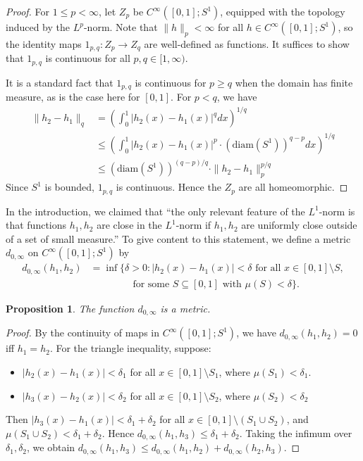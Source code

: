\documentclass[11pt, reqno, english]{amsart}
\theoremstyle{plain}
\newtheorem{proposition}[theorem]{Proposition}
\theoremstyle{definition}
\begin{document}
\begin{proof}
  For $1 \le p < \infty$, let $Z_{p}$ be $C^{\infty}([0, 1]; S^{1})$, equipped
  with the topology induced by the $L^{p}$-norm. Note that $\|h\|_{p} < \infty$
  for all $h \in C^{\infty}([0, 1]; S^{1})$, so the identity maps $1_{p,
  q}\colon Z_{p} \rightarrow Z_{q}$ are well-defined as functions. It suffices
  to show that $1_{p, q}$ is continuous for all $p, q \in [1, \infty)$.

  It is a standard fact that $1_{p, q}$ is continuous for $p \ge q$ when the
  domain has finite measure, as is the case here for $[0, 1]$. For $p < q$, we
  have
  \begin{align*}
    \|h_{2} - h_{1}\|_{q} &= \left(\int_{0}^{1}|h_{2}(x) -
    h_{1}(x)|^{q}dx\right)^{1/q}\\
    &\le \left(\int_{0}^{1}|h_{2}(x) - h_{1}(x)|^{p} \cdot
    (\text{diam}(S^{1}))^{q-p}dx\right)^{1/q}\\
    &\le (\text{diam}(S^{1}))^{(q-p)/q} \cdot \|h_{2} - h_{1}\|_{p}^{p/q}
  \end{align*}
  Since $S^{1}$ is bounded, $1_{p, q}$ is continuous. Hence the $Z_{p}$ are all
  homeomorphic.
\end{proof}

In the introduction, we claimed that ``the only relevant feature of the
$L^{1}$-norm is that functions $h_{1}, h_{2}$ are close in the $L^{1}$-norm if
$h_{1}, h_{2}$ are uniformly close outside of a set of small measure.'' To give
content to this statement, we define a metric $d_{0, \infty}$ on
$C^{\infty}([0, 1]; S^{1})$ by
\begin{align*}
  d_{0, \infty}(h_{1}, h_{2}) &= \inf\{\delta > 0 : |h_{2}(x) - h_{1}(x)| <
  \delta \text{ for all } x \in [0, 1] \setminus S,\\
  &\qquad\qquad \text{ for some } S \subseteq [0, 1] \text{ with } \mu(S) <
  \delta\}.
\end{align*}

\begin{proposition}
  The function $d_{0, \infty}$ is a metric.
\end{proposition}

\begin{proof}
  By the continuity of maps in $C^{\infty}([0, 1]; S^{1})$, we have $d_{0,
  \infty}(h_{1}, h_{2}) = 0$ iff $h_{1} = h_{2}$. For the triangle inequality,
  suppose:
  \begin{itemize}
    \item $|h_{2}(x) - h_{1}(x)| < \delta_{1}$ for all $x \in [0, 1]\setminus
  S_{1}$, where $\mu(S_{1}) < \delta_{1}$.
    \item $|h_{3}(x) - h_{2}(x)| < \delta_{2}$ for all $x \in [0, 1]\setminus
    S_{2}$, where $\mu(S_{2}) < \delta_{2}$
  \end{itemize}
  Then $|h_{3}(x) - h_{1}(x)| < \delta_{1} + \delta_{2}$ for all $x \in [0,
  1]\setminus (S_{1} \cup S_{2})$, and $\mu(S_{1}\cup S_{2}) < \delta_{1} +
  \delta_{2}$. Hence $d_{0, \infty}(h_{1}, h_{3}) \le \delta_{1} + \delta_{2}$.
  Taking the infimum over $\delta_{1}, \delta_{2}$, we obtain $d_{0,
  \infty}(h_{1}, h_{3}) \le d_{0, \infty}(h_{1}, h_{2}) + d_{0, \infty}(h_{2},
  h_{3})$.
\end{proof}
\end{document}
